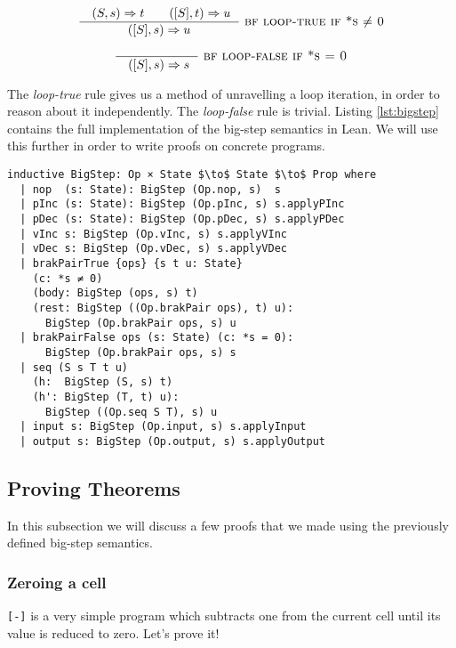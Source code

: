 \documentclass[runningheads]{llncs}
\begin{document}
$$\frac{\quad(S, s) \Rightarrow t \qquad ([S], t) \Rightarrow u\ \ }
     {([S], s) \Rightarrow u}
     \ \textsc{bf loop-true   if *s $\ne$ 0}$$

$$\frac{}{\quad([S], s) \Rightarrow s\ \ }
        \ \textsc{bf loop-false   if *s = 0}$$

The \emph{loop-true} rule gives us a method of unravelling a loop iteration, in
order to reason about it independently. The \emph{loop-false} rule is trivial.
Listing \ref{lst:bigstep} contains the full implementation of the big-step
semantics in Lean. We will use this further in order to write proofs on
concrete programs.

\vspace{2mm}
\begin{lstlisting}[mathescape, label={lst:bigstep},
    caption={Implementation
    of big-step semantics for the Brainf*uck programming language}]
inductive BigStep: Op × State $\to$ State $\to$ Prop where
  | nop  (s: State): BigStep (Op.nop, s)  s
  | pInc (s: State): BigStep (Op.pInc, s) s.applyPInc
  | pDec (s: State): BigStep (Op.pDec, s) s.applyPDec
  | vInc s: BigStep (Op.vInc, s) s.applyVInc
  | vDec s: BigStep (Op.vDec, s) s.applyVDec
  | brakPairTrue {ops} {s t u: State}
    (c: *s ≠ 0)
    (body: BigStep (ops, s) t)
    (rest: BigStep ((Op.brakPair ops), t) u):
      BigStep (Op.brakPair ops, s) u
  | brakPairFalse ops (s: State) (c: *s = 0):
      BigStep (Op.brakPair ops, s) s
  | seq (S s T t u)
    (h:  BigStep (S, s) t)
    (h': BigStep (T, t) u):
      BigStep ((Op.seq S T), s) u
  | input s: BigStep (Op.input, s) s.applyInput
  | output s: BigStep (Op.output, s) s.applyOutput
\end{lstlisting}

\subsection{Proving Theorems}

In this subsection we will discuss a few proofs that we made using the
previously defined big-step semantics.

\vspace{-3mm}
\subsubsection{Zeroing a cell}

\lstinline{[-]} is a very simple program which subtracts one from the current
cell until its value is reduced to zero. Let's prove it!
\end{document}
